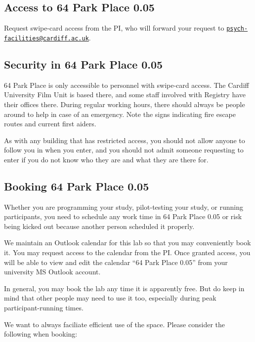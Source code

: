 \documentclass[
  12pt,
]{book}
\begin{document}
\subsection{Access to 64 Park Place 0.05}\label{access-to-64-park-place-0.05}

Request swipe-card access from the PI, who will forward your request to \href{mailto:psych-facilities@cardiff.ac.uk}{\nolinkurl{psych-facilities@cardiff.ac.uk}}.

\subsection{Security in 64 Park Place 0.05}\label{security-in-64-park-place-0.05}

64 Park Place is only accessible to personnel with swipe-card access. The Cardiff University Film Unit is based there, and some staff involved with Registry have their offices there. During regular working hours, there should always be people around to help in case of an emergency. Note the signs indicating fire escape routes and current first aiders.

As with any building that has restricted access, you should not allow anyone to follow you in when you enter, and you should not admit someone requesting to enter if you do not know who they are and what they are there for.

\subsection{Booking 64 Park Place 0.05}\label{booking-64-park-place-0.05}

Whether you are programming your study, pilot-testing your study, or running participants, you need to schedule any work time in 64 Park Place 0.05 or risk being kicked out because another person scheduled it properly.

We maintain an Outlook calendar for this lab so that you may conveniently book it. You may request access to the calendar from the PI. Once granted access, you will be able to view and edit the calendar ``64 Park Place 0.05'' from your university MS Outlook account.

In general, you may book the lab any time it is apparently free. But do keep in mind that other people may need to use it too, especially during peak participant-running times.

We want to always faciliate efficient use of the space. Please consider the following when booking:
\end{document}
